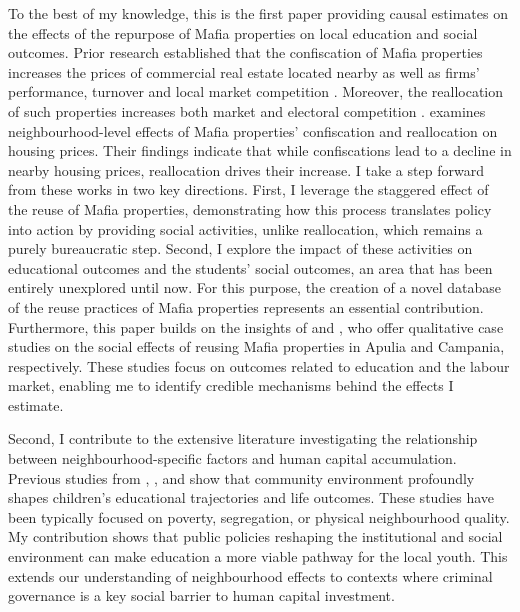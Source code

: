 \documentclass[12pt]{article}
\theoremstyle{plain}
\theoremstyle{plain}
\theoremstyle{plain}
\theoremstyle{definition}
\theoremstyle{plain}
\theoremstyle{definition}
\theoremstyle{plain}
\theoremstyle{remark}
\theoremstyle{definition}
\theoremstyle{definition}
\theoremstyle{plain}
\begin{document}
To the best of my knowledge, this is the first paper providing causal estimates on the effects of the repurpose of Mafia properties on local education and social outcomes. Prior research established that the confiscation of Mafia properties increases the prices of commercial real estate located nearby as well as firms' performance, turnover and local market competition \citep{calamunci_closed_2022, calamunci_economic_2020, ferrante_mafia_2021, operti_tough_2018}. Moreover, the reallocation of such properties increases both market and electoral competition \citep{ferrante_mafia_2021, ferrante_shall_2021}.  \citet{boeri_localized_2023}  examines neighbourhood-level effects of Mafia properties' confiscation and reallocation on housing prices. Their findings indicate that while confiscations lead to a decline in nearby housing prices, reallocation drives their increase. I take a step forward from these works in two key directions. First, I leverage the staggered effect of the reuse of Mafia properties, demonstrating how this process translates policy into action by providing social activities, unlike reallocation, which remains a purely bureaucratic step. Second, I explore the impact of these activities on educational outcomes and the students' social outcomes, an area that has been entirely unexplored until now. For this purpose, the creation of a novel database of the reuse practices of Mafia properties represents an essential contribution. Furthermore, this paper builds on the insights of \citet{nazzaro_il_2021} and \citet{martone_politiche_2020}, who offer qualitative case studies on the social effects of reusing Mafia properties in Apulia and Campania, respectively. These studies focus on outcomes related to education and the labour market, enabling me to identify credible mechanisms behind the effects I estimate.\par 
Second, I contribute to the extensive literature investigating the relationship between neighbourhood-specific factors and human capital accumulation. Previous studies from \citet{ludwig_long-term_2013}, \citet{chetty_impacts_2018}, and \citet{bergman_creating_2024} show that community environment profoundly shapes children's educational trajectories and life outcomes. These studies have been typically focused on poverty, segregation, or physical neighbourhood quality. My contribution shows that public policies reshaping the institutional and social environment can make education a more viable pathway for the local youth. This extends our understanding of neighbourhood effects to contexts where criminal governance is a key social barrier to human capital investment. \par
\end{document}
